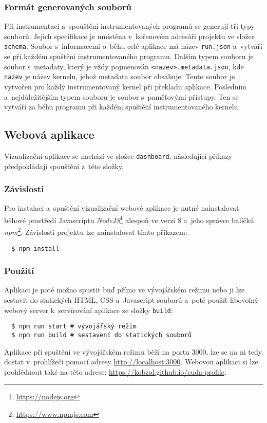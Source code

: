 \subsubsection{Formát generovaných souborů}
Při instrumentaci a~spouštění instrumentovaných programů se generují tři typy souborů. Jejich specifikace je umístěna v~kořenovém adresáři projektu ve složce \texttt{schema}. Soubor s~informacemi o~běhu celé aplikace má název \texttt{run.json} a~vytváří se při každém spuštění instrumentovaného programu. Dalším typem souboru je soubor s~metadaty, který je vždy pojmenován \texttt{<nazev>.metadata.json}, kde \texttt{nazev} je název kernelu, jehož metadata soubor obsahuje. Tento soubor je vytvořen pro každý instrumentovaný kernel při překladu aplikace. Posledním a~nej\-důležitějším typem souboru je soubor s~paměťovými přístupy. Ten se vytváří za běhu programu při každém spuštění instrumentovaného kernelu.

\subsection{Webová aplikace}
Vizualizační aplikace se nachází ve složce \texttt{dashboard}, následující příkazy předpokládají spouštění z~této složky.

\subsubsection{Závislosti}
Pro instalaci a~spuštění vizualizační webové aplikace je nutné nainstalovat běhové prostředí Javascriptu \emph{NodeJS}\footnote{\url{https://nodejs.org}} alespoň ve verzi 8 a~jeho správce balíčků \emph{npm}\footnote{\url{https://www.npmjs.com}}. Závislosti projektu lze nainstalovat tímto příkazem:
\begin{verbatim}
  $ npm install
\end{verbatim}

\subsubsection{Použití}
Aplikaci je poté možno spustit buď přímo ve vývojářském režimu nebo ji lze sestavit do statických HTML, CSS a~Javascript souborů a~poté použít libovolný webový server k~servírování aplikace ze složky \texttt{build}:
\begin{verbatim}
  $ npm run start # vývojářský režim
  $ npm run build # sestavení do statických souborů
\end{verbatim}

Aplikace při spuštění ve vývojářském režimu běží na portu 3000, lze se na ni tedy dostat v~prohlížeči pomocí adresy \url{http://localhost:3000}.
Webovou aplikaci si lze prohlédnout také na této adrese: \url{https://kobzol.github.io/cuda-profile}.
